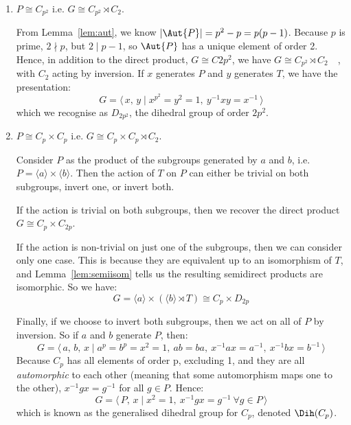 \begin{enumerate}
    \item \(P \cong C_{p^2}\) i.e. \(G \cong C_{p^2} \rtimes C_2\).

        From Lemma~\ref{lem:aut}, we know \(|\Aut{P}| = p^2 - p = p(p-1)\).
        Because \(p\) is prime, \(2 \nmid p\), but \( 2 \mid p - 1\), so \(\Aut{P}\) has a unique element of order 2.
        Hence, in addition to the direct product, \(G \cong C{2p^2}\), we have \(G \cong C_{p^2} \rtimes C_2 \quad \),
        with \(C_2\) acting by inversion.
        If \(x\) generates \(P\) and \(y\) generates \(T\), we have the presentation:
        \[G = \langle\, x,\,y \mid x^{p^2} = y^2 = 1,\ y^{-1}xy = x^{-1}\,\rangle\]
        which we recognise as \(D_{2p^2}\), the dihedral group of order \(2p^2\).

    \item \(P \cong C_p \times C_p\) i.e. \(G \cong C_p \times C_p \rtimes C_2\).

        Consider \(P\) as the product of the subgroups generated by \(a\) and \(b\), i.e. \(P = \langle a \rangle \times
        \langle b \rangle\).
        Then the action of \(T\) on \(P\) can either be trivial on both subgroups, invert one, or invert both.

        If the action is trivial on both subgroups, then we recover the direct product \(G \cong C_p \times C_{2p}\).

        If the action is non-trivial on just one of the subgroups, then we can consider only one case.
        This is because they are equivalent up to an isomorphism of \(T\), and Lemma~\ref{lem:semiisom} tells us the
        resulting semidirect products are isomorphic.
        So we have:
        \[G = \langle a \rangle \times (\langle b \rangle \rtimes T) \cong C_p \times D_{2p}\]
        
        Finally, if we choose to invert both subgroups, then we act on all of \(P\) by inversion.
        So if \(a\) and \(b\) generate \(P\), then:
        \[G = \langle\, a,\,b,\,x \mid a^p = b^p = x^2 = 1,\ ab = ba,\ x^{-1}ax = a^{-1},\ x^{-1}bx = b^{-1}\,\rangle\]
        Because \(C_p\) has all elements of order p, excluding 1, and they are all \emph{automorphic} to each other (meaning
        that some automorphism maps one to the other), \(x^{-1}gx = g^{-1}\) for all \(g \in P\).
        Hence:
        \[G = \langle\, P,\,x \mid x^2 = 1,\ x^{-1}gx = g^{-1}\ \forall g \in P \,\rangle\]
        which is known as the generalised dihedral group for \(C_p\), denoted \(\Dih(C_p)\).

\end{enumerate}
